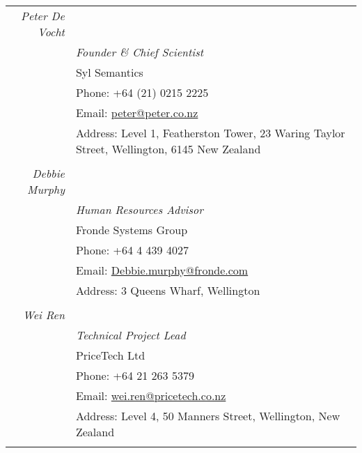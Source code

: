 \documentclass[a4paper,10pt]{article} %
\begin{document}
\begin{tabular}{r|p{11cm}}


\emph{Peter De Vocht}&  \\
& \emph{Founder \& Chief Scientist}\\ 
& Syl Semantics \\
& Phone: +64 (21) 0215 2225\\
& Email: \href{mailto:peter@peter.co.nz}{peter@peter.co.nz}\\
& Address: Level 1, Featherston Tower, 23 Waring Taylor Street, Wellington, 6145 New Zealand \\
\multicolumn{2}{c}{} \\


\emph{Debbie Murphy}&  \\
& \emph{Human Resources Advisor}\\ 
& Fronde Systems Group\\
& Phone:  +64 4 439 4027\\
& Email: \href{mailto:Debbie.murphy@fronde.com}{Debbie.murphy@fronde.com}\\
& Address: 3 Queens Wharf, Wellington\\
\multicolumn{2}{c}{} \\


\emph{Wei Ren}&  \\
& \emph{Technical Project Lead}\\ 
& PriceTech Ltd\\
& Phone: +64 21 263 5379\\
& Email: \href{mailto:wei.ren@pricetech.co.nz}{wei.ren@pricetech.co.nz}\\
& Address: Level 4, 50 Manners Street, Wellington, New Zealand \\
\multicolumn{2}{c}{} \\




\end{tabular}
\end{document}
